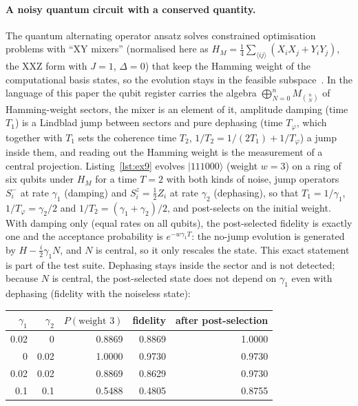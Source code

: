 \documentclass[11pt]{article}
\begin{document}
\paragraph{A noisy quantum circuit with a conserved quantity.} The quantum alternating operator ansatz solves
constrained optimisation problems with ``XY mixers'' (normalised here as $H_M=\frac14\sum_{\langle ij\rangle}(X_iX_j+Y_iY_j)$, the XXZ form with $J=1$, $\Delta=0$) that keep the Hamming weight of the
computational basis states, so the evolution stays in the feasible subspace~\cite{hadfield2019}. In the language of
this paper the qubit register carries the algebra $\bigoplus_{N=0}^nM_{\binom nN}$ of Hamming-weight sectors, the
mixer is an element of it, amplitude damping (time $T_1$) is a Lindblad jump between sectors and pure dephasing (time $T_\varphi$,
which together with $T_1$ sets the coherence time $T_2$, $1/T_2=1/(2T_1)+1/T_\varphi$) a jump inside them, and reading out the Hamming weight is the measurement of a central projection. Listing~\ref{lst:ex9}
evolves $|111000\rangle$ (weight $w=3$) on a ring of six qubits under $H_M$ for a time $T=2$ with both kinds of noise,
jump operators $S^-_i$ at rate $\gamma_1$ (damping) and $S^z_i=\frac12Z_i$ at rate $\gamma_2$ (dephasing), so that $T_1=1/\gamma_1$,
$1/T_\varphi=\gamma_2/2$ and $1/T_2=(\gamma_1+\gamma_2)/2$, and post-selects on the initial weight. With damping only (equal rates on all qubits), the post-selected fidelity is exactly one and the acceptance probability is $e^{-w\gamma_1T}$: the
no-jump evolution is generated by $H-\frac{i}{2}\gamma_1N$, and $N$ is central, so it only rescales the state. This
exact statement is part of the test suite. Dephasing stays inside the sector and is not detected; because $N$ is central, the
post-selected state does not depend on $\gamma_1$ even with dephasing (fidelity with the noiseless state):
\begin{center}\footnotesize
\begin{tabular}{rrrrr}
\toprule
$\gamma_1$ & $\gamma_2$ & $P(\text{weight }3)$ & fidelity & after post-selection\\
\midrule
0.02 & 0 & 0.8869 & 0.8869 & 1.0000\\
0 & 0.02 & 1.0000 & 0.9730 & 0.9730\\
0.02 & 0.02 & 0.8869 & 0.8629 & 0.9730\\
0.1 & 0.1 & 0.5488 & 0.4805 & 0.8755\\
\bottomrule
\end{tabular}
\end{center}

\end{document}
